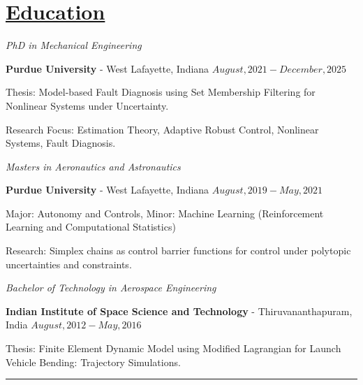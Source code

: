 \section*{\underline{Education}}

\noindent \textit{PhD in Mechanical Engineering}

\textbf{Purdue University} - West Lafayette, Indiana \hfill $August, 2021 - December, 2025$

Thesis: Model-based Fault Diagnosis using Set Membership Filtering for Nonlinear Systems under Uncertainty.

Research Focus: Estimation Theory, Adaptive Robust Control, Nonlinear Systems, Fault Diagnosis.

\medskip

\noindent \textit{Masters in Aeronautics and Astronautics}

\textbf{Purdue University} - West Lafayette, Indiana \hfill $August, 2019 - May, 2021$

Major: Autonomy and Controls, Minor: Machine Learning (Reinforcement Learning and Computational Statistics)

Research: Simplex chains as control barrier functions for control under polytopic uncertainties and constraints.

\medskip

\noindent \textit{Bachelor of Technology in Aerospace Engineering }

\textbf{Indian Institute of Space Science and Technology} - Thiruvananthapuram, India \hfill $ August, 2012 - May, 2016 $

Thesis: Finite Element Dynamic Model using Modified Lagrangian for Launch Vehicle Bending: Trajectory Simulations.
\noindent\rule{\textwidth}{0.4pt}
